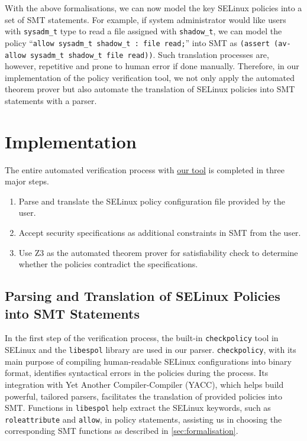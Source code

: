 \documentclass[acmsmall,screen,nonacm]{acmart}
\begin{document}
With the above formalisations, we can now model the key SELinux policies into a 
set of SMT statements. For example, if system administrator would like users 
with \texttt{sysadm\_t} type to read a file assigned with \texttt{shadow\_t}, 
we can model the policy ``\texttt{allow sysadm\_t shadow\_t : file read;}'' 
into SMT as \texttt{(assert (av-allow sysadm\_t shadow\_t file read))}. Such 
translation processes are, however, repetitive and prone to human error if done 
manually. Therefore, in our implementation of the policy verification tool, we 
not only apply the automated theorem prover but also automate the translation 
of SELinux policies into SMT statements with a parser.

\section{Implementation}

The entire automated verification process with 
\href{https://github.com/tsoutsman/comp2560}{our tool} is completed in three 
major steps.
\begin{enumerate}
    \item Parse and translate the SELinux policy configuration file provided by 
the user.
    \item Accept security specifications as additional constraints in SMT from 
the user.
    \item Use Z3 as the automated theorem prover for satisfiability check to 
determine whether the policies contradict the specifications.
\end{enumerate}

\subsection{Parsing and Translation of SELinux Policies into SMT Statements}
\label{sec:parsing}

In the first step of the verification process, the built-in 
\texttt{checkpolicy} tool in SELinux and the \texttt{libespol} library are used 
in our parser. \texttt{checkpolicy}, with its main purpose of compiling 
human-readable SELinux configurations into binary format, identifies 
syntactical errors in the policies during the process. Its integration with Yet 
Another Compiler-Compiler (YACC), which helps build powerful, tailored parsers, 
facilitates the translation of provided policies into SMT. Functions in 
\texttt{libespol} help extract the SELinux keywords, such as 
\texttt{roleattribute} and \texttt{allow}, in policy statements, assisting us 
in choosing the corresponding SMT functions as described in 
\autoref{sec:formalisation}.
\end{document}
